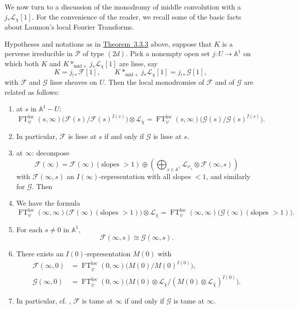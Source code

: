 We now turn to a discussion of the monodromy of middle convolution with a
\(j_*\mathcal{L}_{\chi}[1]\). For the convenience of the reader, we recall
some of the basic facts about Laumon's local Fourier Transforms.

Hypotheses and notations as in \hyperref[thm:3.3.3]{Theorem~3.3.3} above,
suppose that \(K\) is a perverse irreducible in \(\mathcal{P}\) of type
\((2d)\). Pick a nonempty open set \(j:U\to\mathbb{A}^1\) on which both \(K\)
and \(K*_{\mathrm{mid}+}j_*\mathcal{L}_{\chi}[1]\) are lisse, say
\[
  K=j_{!*}\mathcal{F}[1],\qquad
  K*_{\mathrm{mid}+}j_*\mathcal{L}_{\chi}[1]
  =
  j_{!*}\mathcal{G}[1],
\]
with \(\mathcal{F}\) and \(\mathcal{G}\) lisse sheaves on \(U\). Then the local
monodromies of \(\mathcal{F}\) and of \(\mathcal{G}\) are related as follows:
\begin{enumerate}[label=(\arabic*)]
\item at \(s\) in \(\mathbb{A}^1-U\):
\[
  \operatorname{FT}_{\psi}^{\mathrm{loc}}(s,\infty)
  \bigl(\mathcal{F}(s)/\mathcal{F}(s)^{I(s)}\bigr)
  \otimes\mathcal{L}_{\overline{\chi}}
  =
  \operatorname{FT}_{\psi}^{\mathrm{loc}}(s,\infty)
  \bigl(\mathcal{G}(s)/\mathcal{G}(s)^{I(s)}\bigr).
\]
\item[(1a)] In particular, \(\mathcal{F}\) is lisse at \(s\) if and only if
\(\mathcal{G}\) is lisse at \(s\).
\item at \(\infty\): decompose
\[
  \mathcal{F}(\infty)
  =
  \mathcal{F}(\infty)(\text{slopes }>1)
  \oplus
  \left(\bigoplus_{s\in\mathbb{A}^1}
  \mathcal{L}_{\psi_s}\otimes\mathcal{F}(\infty,s)\right)
\]
with \(\mathcal{F}(\infty,s)\) an \(I(\infty)\)-representation with all slopes
\(<1\), and similarly for \(\mathcal{G}\). Then
\item[(2a)] We have the formula
\[
  \operatorname{FT}_{\psi}^{\mathrm{loc}}(\infty,\infty)
  \bigl(\mathcal{F}(\infty)(\text{slopes }>1)\bigr)
  \otimes\mathcal{L}_{\overline{\chi}}
  =
  \operatorname{FT}_{\psi}^{\mathrm{loc}}(\infty,\infty)
  \bigl(\mathcal{G}(\infty)(\text{slopes }>1)\bigr).
\]
\item[(2b)] For each \(s\ne0\) in \(\mathbb{A}^1\),
\[
  \mathcal{F}(\infty,s)\cong\mathcal{G}(\infty,s).
\]
\item[(2c)] There exists an \(I(0)\)-representation \(M(0)\) with
\[
\begin{aligned}
  \mathcal{F}(\infty,0)
  &=
  \operatorname{FT}_{\overline{\psi}}^{\mathrm{loc}}(0,\infty)
  \bigl(M(0)/M(0)^{I(0)}\bigr),\\
  \mathcal{G}(\infty,0)
  &=
  \operatorname{FT}_{\overline{\psi}}^{\mathrm{loc}}(0,\infty)
  \bigl(M(0)\otimes\mathcal{L}_{\overline{\chi}}
  /(M(0)\otimes\mathcal{L}_{\overline{\chi}})^{I(0)}\bigr).
\end{aligned}
\]
\item[(2d)] In particular, cf. \cite[7.4.4]{Ka-ESDE}, \(\mathcal{F}\) is
tame at \(\infty\) if and only if \(\mathcal{G}\) is tame at \(\infty\).
\end{enumerate}

